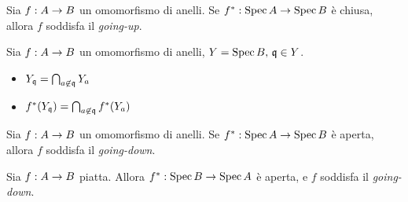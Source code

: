 \begin{proposition}
Sia $f:A\rightarrow B$ un omomorfismo di anelli. Se $f^*:\operatorname{Spec} A\rightarrow \operatorname{Spec} B$ è chiusa, allora $f$ soddisfa il \emph{going-up}.
\end{proposition}
\begin{proposition}
Sia $f:A\rightarrow B$ un omomorfismo di anelli, $Y=\operatorname{Spec} B,\,\allowbreak\mathfrak{q}\in Y$.
\begin{itemize}
\item $Y_{\mathfrak{q}}=\bigcap_{a\not\in\mathfrak{q}}Y_a$
\item $f^*(Y_{\mathfrak{q}})=\bigcap_{a\not\in\mathfrak{q}}f^*(Y_a)$
\end{itemize}
\end{proposition}
\begin{proposition}
Sia $f:A\rightarrow B$ un omomorfismo di anelli. Se $f^*:\operatorname{Spec} A\rightarrow \operatorname{Spec} B$ è aperta, allora $f$ soddisfa il \emph{going-down}.
\end{proposition}
\begin{proposition}
Sia $f:A\rightarrow B$ piatta. Allora $f^*:\operatorname{Spec} B\rightarrow \operatorname{Spec} A$ è aperta, e $f$ soddisfa il \emph{going-down}.
\end{proposition}







